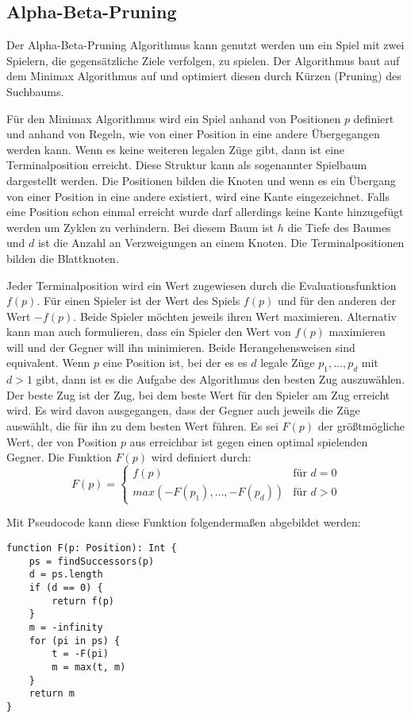 \subsection{Alpha-Beta-Pruning}
Der Alpha-Beta-Pruning Algorithmus kann genutzt werden um ein Spiel mit zwei Spielern, die gegensätzliche Ziele verfolgen, zu spielen. Der Algorithmus baut auf dem Minimax Algorithmus auf und optimiert diesen durch Kürzen (Pruning) des Suchbaums.

Für den Minimax Algorithmus wird ein Spiel anhand von Positionen $p$ definiert und anhand von Regeln, wie von einer Position in eine andere Übergegangen werden kann. Wenn es keine weiteren legalen Züge gibt, dann ist eine Terminalposition erreicht. Diese Struktur kann als sogenannter Spielbaum dargestellt werden. Die Positionen bilden die Knoten und wenn es ein Übergang von einer Position in eine andere existiert, wird eine Kante eingezeichnet. Falls eine Position schon einmal erreicht wurde darf allerdings keine Kante hinzugefügt werden um Zyklen zu verhindern. Bei diesem Baum ist $h$ die Tiefe des Baumes und $d$ ist die Anzahl an Verzweigungen an einem Knoten. Die Terminalpositionen bilden die Blattknoten.
\cite{knuth_analysis_1975}

Jeder Terminalposition wird ein Wert zugewiesen durch die Evaluationsfunktion $f(p)$. Für einen Spieler ist der Wert des Spiels $f(p)$ und für den anderen der Wert $-f(p)$. Beide Spieler möchten jeweils ihren Wert maximieren. Alternativ kann man auch formulieren, dass ein Spieler den Wert von $f(p)$ maximieren will und der Gegner will ihn minimieren.
Beide Herangehensweisen sind equivalent. Wenn $p$ eine Position ist, bei der es es $d$ legale Züge $p_1,\ldots,p_d$ mit $d > 1$ gibt, dann ist es die Aufgabe des Algorithmus den besten Zug auszuwählen. Der beste Zug ist der Zug, bei dem beste Wert für den Spieler am Zug erreicht wird. Es wird davon ausgegangen, dass der Gegner auch jeweils die Züge auswählt, die für ihn zu dem besten Wert führen. Es sei $F(p)$ der größtmögliche Wert, der von Position $p$ aus erreichbar ist gegen einen optimal spielenden Gegner. Die Funktion $F(p)$ wird definiert durch:
\begin{equation}
    F(p) = 
    \begin{cases}
        f(p) & \text{für } d = 0 \\
        max(-F(p_1),\ldots,-F(p_d)) & \text{für } d > 0
    \end{cases}
\end{equation}

Mit Pseudocode kann diese Funktion folgendermaßen abgebildet werden:
\begin{lstlisting}
function F(p: Position): Int {
    ps = findSuccessors(p)
    d = ps.length
    if (d == 0) {
        return f(p)
    }
    m = -infinity
    for (pi in ps) {
        t = -F(pi)
        m = max(t, m)
    }
    return m
}
\end{lstlisting}

